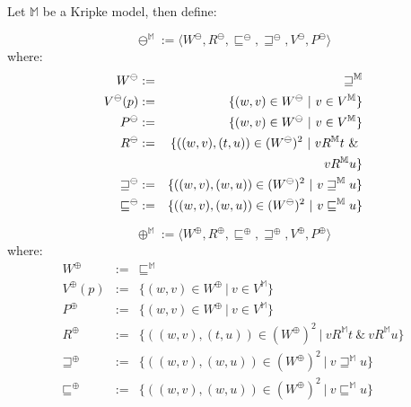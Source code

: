 \begin{mydef}
\label{Plus-Minus-Bisimulators}
Let $\mathbb{M}$ be a Kripke model, then define:

\begin{minipage}[b]{0.5\linewidth}
$$\ominus^\mathbb{M} := \langle W^{\ominus}, R^{\ominus}, \sqsubseteq^{\ominus},
\sqsupseteq^{\ominus}, V^{\ominus}, P^{\ominus} \rangle$$ 
where:
 \begin{eqnarray*}
 W^\ominus & := &  \sqsupseteq^{\mathbb{M}} \\
 V^\ominus(p) & := &  \{(w,v) \in   W^\ominus \ |\ v \in V^{\mathbb{M}} \}\\
 P^\ominus & := & \{(w,v) \in   W^\ominus \ |\ v \in V^{\mathbb{M}} \} \\
 R^\ominus & := &  \{((w,v), (t,u)) \in   (W^\ominus)^2 \ |\ v
 R^\mathbb{M} t\ \&\ \\
& & \hspace{4.36cm} v
 R^\mathbb{M} u \}  \\
 \sqsupseteq^\ominus & := &  \{((w,v), (w,u)) \in   (W^\ominus)^2 \ |\ v \sqsupseteq^{\mathbb{M}} u \}  \\
 \sqsubseteq^\ominus & := &  \{((w,v), (w,u)) \in   (W^\ominus)^2 \ |\ v \sqsubseteq^{\mathbb{M}} u \}  
 \end{eqnarray*}
\end{minipage}
\hspace{0.5cm}
\begin{minipage}[b]{0.5\linewidth}
$$\oplus^\mathbb{M} := \langle W^{\oplus}, R^{\oplus}, \sqsubseteq^{\oplus},
\sqsupseteq^{\oplus}, V^{\oplus}, P^{\oplus} \rangle$$ 
where:
 \begin{eqnarray*}
 W^\oplus & := &  \sqsubseteq^{\mathbb{M}} \\
 V^\oplus(p) & := &  \{(w,v) \in   W^\oplus \ |\ v \in V^{\mathbb{M}} \}\\
 P^\oplus & := & \{(w,v) \in   W^\oplus \ |\ v \in V^{\mathbb{M}} \} \\
 R^\oplus & := &  \{((w,v), (t,u)) \in   (W^\oplus)^2 \ |\ v
 R^\mathbb{M} t\ \&\ v R^\mathbb{M} u \}  \\
 \sqsupseteq^\oplus & := &  \{((w,v), (w,u)) \in   (W^\oplus)^2 \ |\ v \sqsupseteq^{\mathbb{M}} u \}  \\
 \sqsubseteq^\oplus & := &  \{((w,v), (w,u)) \in   (W^\oplus)^2 \ |\ v \sqsubseteq^{\mathbb{M}} u \}  
 \end{eqnarray*}
\end{minipage}
\end{mydef}

